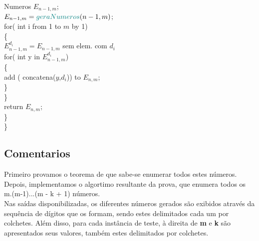 \documentclass[twoside]{article}
\begin{document}
\begin{multicols}{2}
\hspace*{10mm} {\color[rgb]{0,0,1} Numeros} $E_{n-1,m}$;\\
\hspace*{10mm} $E_{n-1,m} = {\color[rgb]{0,0.5,0.5} geraNumeros}(n-1,m)$;\\
\hspace*{10mm} {\color[rgb]{0.7,0.3,0} for}({\color[rgb]{0,0,1} int} i {\color[rgb]{0.7,0.3,0} from} 1 {\color[rgb]{0.7,0.3,0} to} $m$ {\color[rgb]{0.7,0.3,0} by} 1)\\
\hspace*{10mm} \{\\
\hspace*{15mm} $E_{n-1,m}^{d_i} = E_{n-1,m}$ {\color[rgb]{0,0.5,0.5}sem elem. com} $d_i$\\
\hspace*{15mm} {\color[rgb]{0.7,0.3,0} for}({\color[rgb]{0,0,1} int} y {\color[rgb]{0.7,0.3,0} in} $E_{n-1,m}^{d_i}$)\\
\hspace*{15mm} \{\\
\hspace*{20mm} {\color[rgb]{0,0.5,0.5} add} ({\color[rgb]{0,0.5,0.5} concatena}($y$,$d_i$)) {\color[rgb]{0,0.5,0.5} to} $E_{n,m}$;\\
\hspace*{15mm} \}\\
\hspace*{10mm} \}\\
\hspace*{10mm} {\color[rgb]{0.5,0,1} return}  $E_{n,m}$;\\
\hspace*{5mm} \}\\
\}

\subsection{ Comentarios }
\indent  Primeiro provamos o teorema de que sabe-se enumerar todos estes números. Depois, implementamos o algortimo resultante da prova, que enumera todos os m.(m-1)...(m - k + 1) números.\\

\indent Nas saídas disponibilizadas, os diferentes números gerados são exibidos através da sequência de dígitos que os formam, sendo estes delimitados cada um por colchetes. Além disso, para cada instância de teste, à direita de \textbf{m} e \textbf{k} são apresentados seus valores, também estes delimitados por colchetes.\\


\end{multicols}
\end{document}
